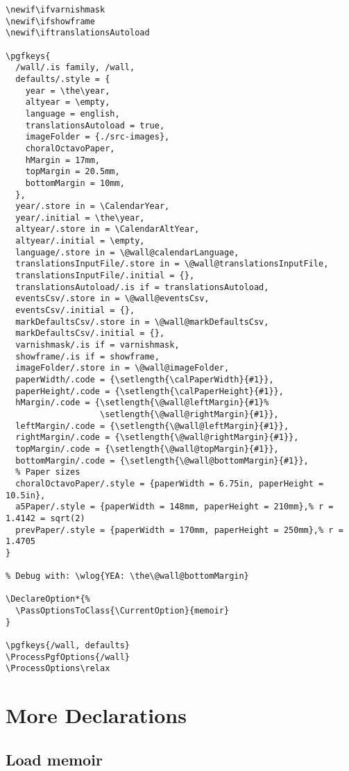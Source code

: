 \documentclass[11pt,oneside]{memoir-article}
\begin{document}
\begin{verbatim}
\newif\ifvarnishmask
\newif\ifshowframe
\newif\iftranslationsAutoload

\pgfkeys{
  /wall/.is family, /wall,
  defaults/.style = {
    year = \the\year,
    altyear = \empty,
    language = english,
    translationsAutoload = true,
    imageFolder = {./src-images},
    choralOctavoPaper,
    hMargin = 17mm,
    topMargin = 20.5mm,
    bottomMargin = 10mm,
  },
  year/.store in = \CalendarYear,
  year/.initial = \the\year,
  altyear/.store in = \CalendarAltYear,
  altyear/.initial = \empty,
  language/.store in = \@wall@calendarLanguage,
  translationsInputFile/.store in = \@wall@translationsInputFile,
  translationsInputFile/.initial = {},
  translationsAutoload/.is if = translationsAutoload,
  eventsCsv/.store in = \@wall@eventsCsv,
  eventsCsv/.initial = {},
  markDefaultsCsv/.store in = \@wall@markDefaultsCsv,
  markDefaultsCsv/.initial = {},
  varnishmask/.is if = varnishmask,
  showframe/.is if = showframe,
  imageFolder/.store in = \@wall@imageFolder,
  paperWidth/.code = {\setlength{\calPaperWidth}{#1}},
  paperHeight/.code = {\setlength{\calPaperHeight}{#1}},
  hMargin/.code = {\setlength{\@wall@leftMargin}{#1}%
                   \setlength{\@wall@rightMargin}{#1}},
  leftMargin/.code = {\setlength{\@wall@leftMargin}{#1}},
  rightMargin/.code = {\setlength{\@wall@rightMargin}{#1}},
  topMargin/.code = {\setlength{\@wall@topMargin}{#1}},
  bottomMargin/.code = {\setlength{\@wall@bottomMargin}{#1}},
  % Paper sizes
  choralOctavoPaper/.style = {paperWidth = 6.75in, paperHeight = 10.5in},
  a5Paper/.style = {paperWidth = 148mm, paperHeight = 210mm},% r = 1.4142 = sqrt(2)
  prevPaper/.style = {paperWidth = 170mm, paperHeight = 250mm},% r = 1.4705
}

% Debug with: \wlog{YEA: \the\@wall@bottomMargin}

\DeclareOption*{%
  \PassOptionsToClass{\CurrentOption}{memoir}
}

\pgfkeys{/wall, defaults}
\ProcessPgfOptions{/wall}
\ProcessOptions\relax
\end{verbatim}

\chapter{More Declarations}
\label{sec-6}
\section{Load memoir}
\label{sec-6-1}
\end{document}
